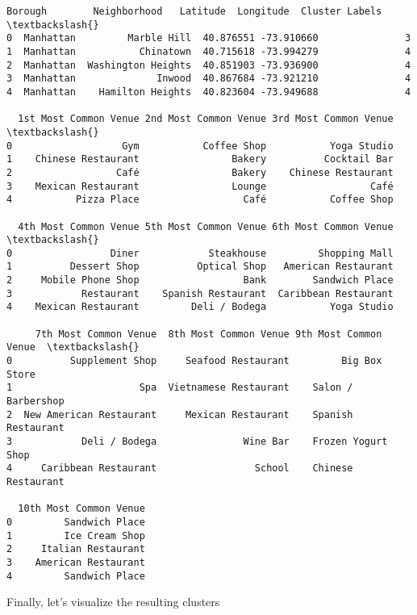 \documentclass[11pt]{article}
\makeatletter
\newcommand{\boxspacing}{\kern\kvtcb@left@rule\kern\kvtcb@boxsep}
\newcommand{\prompt}[4]{
        \ttfamily\llap{{\color{#2}[#3]:\hspace{3pt}#4}}\vspace{-\baselineskip}
    }
\makeatother
\begin{document}
            \begin{tcolorbox}[breakable, size=fbox, boxrule=.5pt, pad at break*=1mm, opacityfill=0]
\prompt{Out}{outcolor}{65}{\boxspacing}
\begin{Verbatim}[commandchars=\\\{\}]
     Borough        Neighborhood   Latitude  Longitude  Cluster Labels  \textbackslash{}
0  Manhattan         Marble Hill  40.876551 -73.910660               3
1  Manhattan           Chinatown  40.715618 -73.994279               4
2  Manhattan  Washington Heights  40.851903 -73.936900               4
3  Manhattan              Inwood  40.867684 -73.921210               4
4  Manhattan    Hamilton Heights  40.823604 -73.949688               4

  1st Most Common Venue 2nd Most Common Venue 3rd Most Common Venue  \textbackslash{}
0                   Gym           Coffee Shop           Yoga Studio
1    Chinese Restaurant                Bakery          Cocktail Bar
2                  Café                Bakery    Chinese Restaurant
3    Mexican Restaurant                Lounge                  Café
4           Pizza Place                  Café           Coffee Shop

  4th Most Common Venue 5th Most Common Venue 6th Most Common Venue  \textbackslash{}
0                 Diner            Steakhouse         Shopping Mall
1          Dessert Shop          Optical Shop   American Restaurant
2     Mobile Phone Shop                  Bank        Sandwich Place
3            Restaurant    Spanish Restaurant  Caribbean Restaurant
4    Mexican Restaurant         Deli / Bodega           Yoga Studio

     7th Most Common Venue  8th Most Common Venue 9th Most Common Venue  \textbackslash{}
0          Supplement Shop     Seafood Restaurant         Big Box Store
1                      Spa  Vietnamese Restaurant    Salon / Barbershop
2  New American Restaurant     Mexican Restaurant    Spanish Restaurant
3            Deli / Bodega               Wine Bar    Frozen Yogurt Shop
4     Caribbean Restaurant                 School    Chinese Restaurant

  10th Most Common Venue
0         Sandwich Place
1         Ice Cream Shop
2     Italian Restaurant
3    American Restaurant
4         Sandwich Place
\end{Verbatim}
\end{tcolorbox}
        
    Finally, let's visualize the resulting clusters
\end{document}
